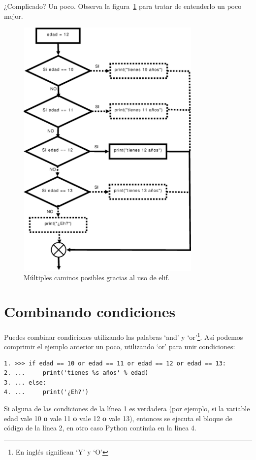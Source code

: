 ¿Complicado? Un poco. Observa la figura~\ref{if7} para tratar de entenderlo un poco mejor.

\begin{figure}
\begin{center}
\includegraphics[width=90mm]{if7.eps}
\end{center}
\caption{Múltiples caminos posibles gracias al uso de elif.}\label{if7}
\end{figure}

\section{Combinando condiciones}
Puedes combinar condiciones utilizando las palabras `and' y `or'\footnote{En inglés significan `Y' y `O'}. Así podemos comprimir el ejemplo anterior un poco, utilizando `or' para unir condiciones:

\begin{listing}
\begin{verbatim}
1. >>> if edad == 10 or edad == 11 or edad == 12 or edad == 13:
2. ...     print('tienes %s años' % edad)
3. ... else:
4. ...     print('¿Eh?')
\end{verbatim}
\end{listing}

Si alguna de las condiciones de la línea 1 es verdadera (por ejemplo, si la variable edad vale 10 \textbf{o} vale 11 \textbf{o} vale 12 \textbf{o} vale 13), entonces se ejecuta el bloque de código de la línea 2, en otro caso Python continúa en la línea 4.  

